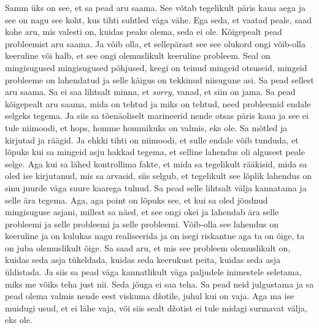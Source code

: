 Samm üks on see, et sa pead aru saama. See võtab tegelikult päris kaua aega ja 
see on nagu see koht, kus tihti suhtled väga vähe. Ega seda, et vaatad peale, 
saad kohe aru,  mis valesti on, kuidas peaks olema, seda ei ole. Kõigepealt 
pead probleemist aru saama. Ja võib olla, et  sellepärast see see olukord ongi 
võib-olla keeruline või halb,  et see ongi olemuslikult keeruline probleem. 
Seal on mingisugused mingisugused põhjused, keegi on teinud mingeid otsuseid, 
mingeid probleeme on lahendatud ja selle käigus on tekkinud niisugune asi. Sa 
pead sellest aru saama. Sa ei saa lihtsalt minna, et \emph{sorry}, vanad, et 
siin on jama. Sa pead kõigepealt aru saama, mida on tehtud ja miks on tehtud, 
need probleemid endale selgeks tegema. Ja siis sa tõenäoliselt marineerid nende 
otsas päris kaua ja see ei tule niimoodi, et hops, homme hommikuks on valmis, 
eks ole. Sa mõtled ja kirjutad ja räägid. Ja ehkki tihti on niimoodi, et  sulle 
endale võib tunduda, et lõpuks kui sa mingeid asju hakkad tegema, et selline 
lahendus oli algusest peale selge. Aga kui sa lähed kontrollima fakte, et mida 
sa tegelikult rääkisid, mida sa oled ise kirjutanud, mis sa arvasid, siis 
selgub, et tegelikult see lõplik lahendus on sinu juurde väga suure kaarega 
tulnud. Sa pead selle lihtsalt välja kannatama ja selle ära tegema. Aga, aga 
point on lõpuks see, et kui sa oled jõudnud mingisuguse asjani, millest sa 
näed, et see ongi okei ja lahendab ära  selle probleemi ja selle probleemi ja 
selle probleemi. Võib-olla see lahendus on keeruline ja on kulukas nagu 
realiseerida ja on isegi riskantne aga ta on õige, ta on juba olemuslikult 
õige. Sa saad aru, et mis see probleem olemuslikult on, kuidas seda asja  
tükeldada, kuidas seda keerukust peita, kuidas seda asja üldistada. Ja siis sa 
pead väga kannatlikult väga paljudele inimestele seletama, miks me võiks teha 
just nii. Seda jõuga ei saa teha. Sa pead neid julgustama ja sa pead olema 
valmis nende eest viskuma džotile, juhul kui on vaja. Aga ma ise muidugi usud, 
et ei lähe vaja, või siis sealt džotist ei tule midagi surmavat välja, eks ole.	